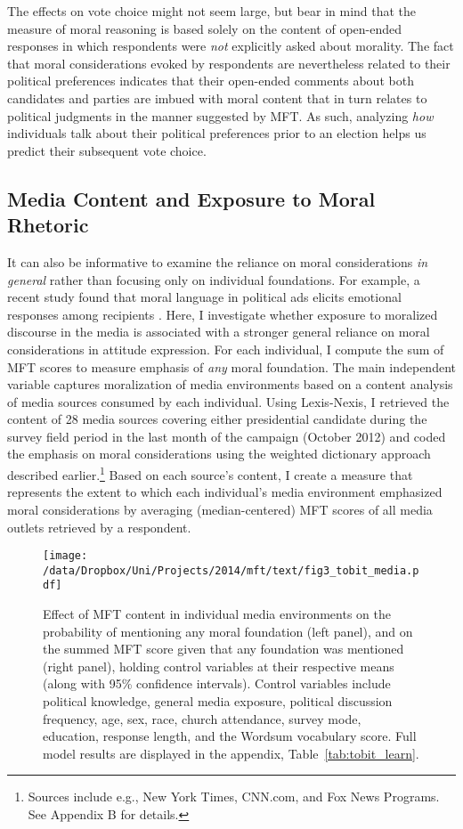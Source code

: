 The effects on vote choice might not seem large, but bear in mind that the measure of moral reasoning is based solely on the content of open-ended responses in which respondents were \textit{not} explicitly asked about morality. The fact that moral considerations evoked by respondents are nevertheless related to their political preferences indicates that their open-ended comments about both candidates and parties are imbued with moral content that in turn relates to political judgments in the manner suggested by MFT. As such, analyzing \textit{how} individuals talk about their political preferences prior to an election helps us predict their subsequent vote choice.


\subsection{Media Content and Exposure to Moral Rhetoric}

It can also be informative to examine the reliance on moral considerations \textit{in general} rather than focusing only on individual foundations. For example, a recent study found that moral language in political ads elicits emotional responses among recipients \citep{lipsitz2017playing}. Here, I investigate whether exposure to moralized discourse in the media is associated with a stronger general reliance on moral considerations in attitude expression. For each individual, I compute the sum of MFT scores to measure emphasis of \textit{any} moral foundation. The main independent variable captures moralization of media environments based on a content analysis of media sources consumed by each individual. Using Lexis-Nexis, I retrieved the content of 28 media sources covering either presidential candidate during the survey field period in the last month of the campaign (October 2012) and coded the emphasis on moral considerations using the weighted dictionary approach described earlier.\footnote{Sources include e.g., New York Times, CNN.com, and Fox News Programs. See Appendix B for details.} Based on each source's content, I create a measure that represents the extent to which each individual's media environment emphasized moral considerations by averaging (median-centered) MFT scores of all media outlets retrieved by a respondent.

\begin{figure}[h]\centering
\texttt{[image: /data/Dropbox/Uni/Projects/2014/mft/text/fig3\_tobit\_media.pdf]}
\caption[Effect of moral content in individual media environments on moral reasoning in open-ended responses]{Effect of MFT content in individual media environments on the probability of mentioning any moral foundation (left panel), and on the summed MFT score given that any foundation was mentioned (right panel), holding control variables at their respective means (along with 95\% confidence intervals). Control variables include political knowledge, general media exposure, political discussion frequency, age, sex, race, church attendance, survey mode, education, response length, and the Wordsum vocabulary score. Full model results are displayed in the appendix, Table~\ref{tab:tobit_learn}.
}\label{fig:tobit_media}
\end{figure}

